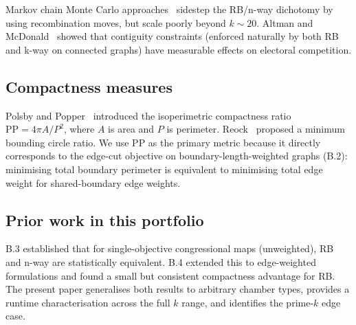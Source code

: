 Markov chain Monte Carlo approaches~\citep{deford2019recombination,fifield2020automated}
sidestep the RB/n-way dichotomy by using recombination moves, but scale
poorly beyond $k \sim 20$.  Altman and McDonald~\citep{altman2005contiguity}
showed that contiguity constraints (enforced naturally by both RB and k-way
on connected graphs) have measurable effects on electoral competition.

\subsection{Compactness measures}

Polsby and Popper~\citep{polsby1991third} introduced the isoperimetric
compactness ratio $\mathrm{PP} = 4\pi A / P^2$, where $A$ is area and
$P$ is perimeter.  Reock~\citep{reock1961measuring} proposed a minimum
bounding circle ratio.  We use PP as the primary metric because it directly
corresponds to the edge-cut objective on boundary-length-weighted graphs
(B.2): minimising total boundary perimeter is equivalent to minimising
total edge weight for shared-boundary edge weights.

\subsection{Prior work in this portfolio}

B.3 established that for single-objective congressional maps (unweighted),
RB and n-way are statistically equivalent.  B.4 extended this to
edge-weighted formulations and found a small but consistent compactness
advantage for RB.  The present paper generalises both results to arbitrary
chamber types, provides a runtime characterisation across the full $k$
range, and identifies the prime-$k$ edge case.
